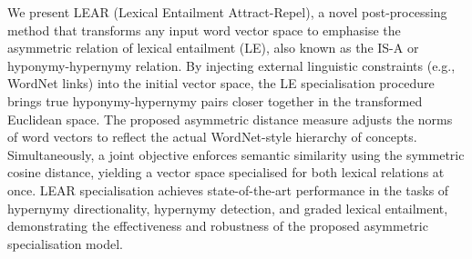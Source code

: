 We present LEAR (Lexical Entailment Attract-Repel), a novel post-processing method that transforms any input word vector space to emphasise the asymmetric relation of lexical entailment (LE), also known as the IS-A or hyponymy-hypernymy relation. By injecting external linguistic constraints (e.g., WordNet links) into the initial vector space, the LE specialisation procedure brings true hyponymy-hypernymy pairs closer together in the transformed Euclidean space. The proposed asymmetric distance measure adjusts the norms of word vectors to reflect the actual WordNet-style hierarchy of concepts. Simultaneously, a joint objective enforces semantic similarity using the symmetric cosine distance, yielding a vector space specialised for both lexical relations at once. LEAR specialisation achieves state-of-the-art performance in the tasks of hypernymy directionality, hypernymy detection, and graded lexical entailment, demonstrating the effectiveness and robustness of the proposed asymmetric specialisation model.
